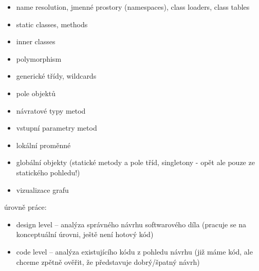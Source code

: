 \begin{itemize}
\item name resolution, jmenné prostory (namespaces), class loaders, class tables
\item static classes, methods
\item inner classes
\item polymorphism
\item generické třídy, wildcards
\item pole objektů
\item návratové typy metod
\item vstupní parametry metod
\item lokální proměnné
\item globální objekty (statické metody a pole tříd, singletony - opět ale pouze ze statického pohledu!)
\item vizualizace grafu
\end{itemize}


úrovně práce:

\begin{itemize}
\item design level -- analýza správného návrhu softwarového díla (pracuje se na konceptuální úrovni, ještě není hotový kód)
\item code level -- analýza existujícího kódu z pohledu návrhu (již máme kód, ale chceme zpětně ověřit, že představuje dobrý/špatný návrh)
\end{itemize}











